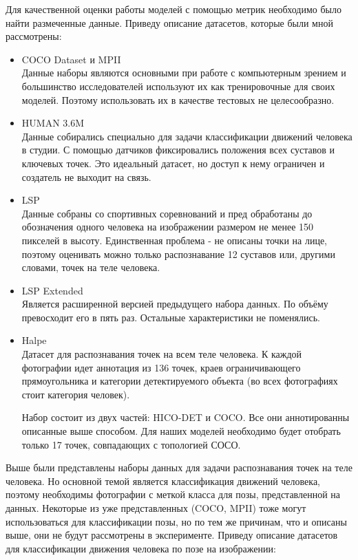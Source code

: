Для качественной оценки работы моделей с помощью метрик необходимо было найти размеченные данные. Приведу описание датасетов, которые были мной рассмотрены:

\begin{itemize}
	\item COCO Dataset и MPII\\
	Данные наборы являются основными при работе с компьютерным зрением и большинство исследователей используют их как тренировочные для своих моделей. Поэтому использовать их в качестве тестовых не целесообразно. \cite{COCO_dataset, MPII_dataset}
	\item HUMAN 3.6M\\
	Данные собирались специально для задачи классификации движений человека в студии. С помощью датчиков фиксировались положения всех суставов и ключевых точек. Это идеальный датасет, но доступ к нему ограничен и создатель не выходит на связь. \cite{h36m_pami}
	\hfill \break
	\item LSP\\
	Данные собраны со спортивных соревнований и пред обработаны до обозначения одного человека на изображении размером не менее 150 пикселей в высоту. Единственная проблема - не описаны точки на лице, поэтому оценивать можно только распознавание 12 суставов или, другими словами, точек на теле человека. \cite{LSP}
	\item LSP Extended\\
	Является расширенной версией предыдущего набора данных. По объёму превосходит его в пять раз. Остальные характеристики не поменялись. \cite{LSPE}
	\item Halpe\\
	Датасет для распознавания точек на всем теле человека. К каждой фотографии идет аннотация из 136 точек, краев ограничивающего прямоугольника и категории детектируемого объекта (во всех фотографиях стоит категория человек).
	
	Набор состоит из двух частей: HICO-DET и COCO. Все они аннотированны описанные выше способом. Для наших моделей необходимо будет отобрать только 17 точек, совпадающих с топологией СОСО. \cite{Halpe_dataset}
\end{itemize}

Выше были представлены наборы данных для задачи распознавания точек на теле человека. Но основной темой является классификация движений человека, поэтому необходимы фотографии с меткой класса для позы, представленной на данных. Некоторые из уже представленных (COCO, MPII) тоже могут использоваться для классификации позы, но по тем же причинам, что и описаны выше, они не будут рассмотрены в эксперименте. Приведу описание датасетов для классификации движения человека по позе на изображении:



